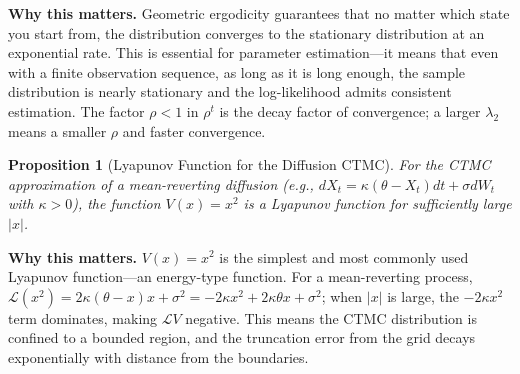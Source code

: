 \documentclass[11pt,a4paper,openany]{book}
\theoremstyle{definition}
\theoremstyle{plain}
\newtheorem{proposition}[theorem]{Proposition}
\theoremstyle{remark}
\newcommand{\1}{\mathbbm{1}}
\begin{document}
\medskip
\noindent\textbf{Why this matters.} Geometric ergodicity guarantees that no matter which state you start from, the distribution converges to the stationary distribution at an exponential rate. This is essential for parameter estimation---it means that even with a finite observation sequence, as long as it is long enough, the sample distribution is nearly stationary and the log-likelihood admits consistent estimation. The factor $\rho < 1$ in $\rho^t$ is the decay factor of convergence; a larger $\lambda_2$ means a smaller $\rho$ and faster convergence.

\begin{proposition}[Lyapunov Function for the Diffusion CTMC]
For the CTMC approximation of a mean-reverting diffusion (e.g., $dX_{t} = \kappa(\theta - X_{t}) dt + \sigma dW_{t}$ with $\kappa > 0$), the function $V(x) = x^{2}$ is a Lyapunov function for sufficiently large $|x|$.
\end{proposition}

\medskip
\noindent\textbf{Why this matters.} $V(x) = x^2$ is the simplest and most commonly used Lyapunov function---an energy-type function. For a mean-reverting process, $\mathcal{L}(x^2) = 2\kappa(\theta - x)x + \sigma^2 = -2\kappa x^2 + 2\kappa\theta x + \sigma^2$; when $|x|$ is large, the $-2\kappa x^2$ term dominates, making $\mathcal{L}V$ negative. This means the CTMC distribution is confined to a bounded region, and the truncation error from the grid decays exponentially with distance from the boundaries.
\end{document}

